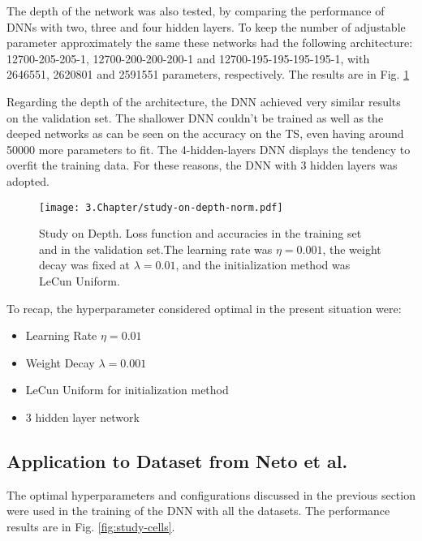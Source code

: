 
The depth of the network was also tested, by comparing the performance of DNNs with two, three and four hidden layers. To keep the number of adjustable parameter approximately the same these networks had the following architecture:
12700-205-205-1, 12700-200-200-200-1 and 12700-195-195-195-195-1, with 2646551, 2620801 and 2591551 parameters, respectively. The results are in Fig. \ref{fig:study-depth}

Regarding the depth of the architecture, the DNN achieved very similar results on the validation set. The shallower DNN couldn't be trained as well as the deeped networks as can be seen on the accuracy on the TS, even having around 50000 more parameters to fit. The 4-hidden-layers DNN displays the tendency to overfit the training data. For these reasons, the DNN with 3 hidden layers was adopted.

\begin{figure}[htbp]
	\centering
	\texttt{[image: 3.Chapter/study-on-depth-norm.pdf]}
	\caption{Study on Depth. Loss function and accuracies in the training set and in the validation set.The learning rate was $\eta = 0.001$, the weight decay was fixed at $\lambda = 0.01$, and the initialization method was LeCun Uniform.
}
\label{fig:study-depth}
\end{figure}

To recap, the hyperparameter considered optimal in the present situation were:
\begin{itemize}
\item Learning Rate $\eta = 0.01$
\item Weight Decay $\lambda = 0.001$
\item LeCun Uniform for initialization method
\item 3 hidden layer network
\end{itemize}

\subsection{Application to Dataset from Neto et al.}
\label{subsec:application}
The optimal hyperparameters and configurations discussed in the previous section were used in the training of the DNN with all the datasets. The performance results are in Fig. \ref{fig:study-cells}.

